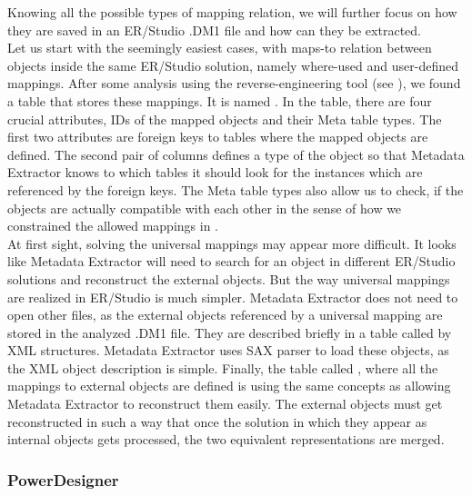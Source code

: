 Knowing all the possible types of mapping relation, we will further focus on how they are saved in an ER/Studio .DM1 file and how can they be extracted. \\ 

Let us start with the seemingly easiest cases, with maps-to relation between objects inside the same ER/Studio solution, namely where-used and user-defined mappings. 
After some analysis using the reverse-engineering tool (see ), we found a table that stores these mappings. It is named .
In the table, there are four crucial attributes, IDs of the mapped objects and their Meta table types.
The first two attributes are foreign keys to tables where the mapped objects are defined. The second pair of columns defines a type of the object so that Metadata Extractor knows to which tables it should look for the instances which are referenced by the foreign keys. 
The Meta table types also allow us to check, if the objects are actually compatible with each other in the sense of how we constrained the allowed mappings in . \\

At first sight, solving the universal mappings may appear more difficult. It looks like Metadata Extractor will need to search for an object in different ER/Studio solutions and reconstruct the external objects. 
But the way universal mappings are realized in ER/Studio is much simpler. 
Metadata Extractor does not need to open other files, as the external objects referenced by a universal mapping are stored in the analyzed .DM1 file. 
They are described briefly in a table called  by XML structures.
Metadata Extractor uses SAX parser to load these objects, as the XML object description is simple.
Finally, the table called , where all the mappings to external objects are defined is using the same concepts as  allowing Metadata Extractor to reconstruct them easily. The external objects must get reconstructed in such a way that once the solution in which they appear as internal objects gets processed, the two equivalent representations are merged.

\subsubsection{PowerDesigner}

